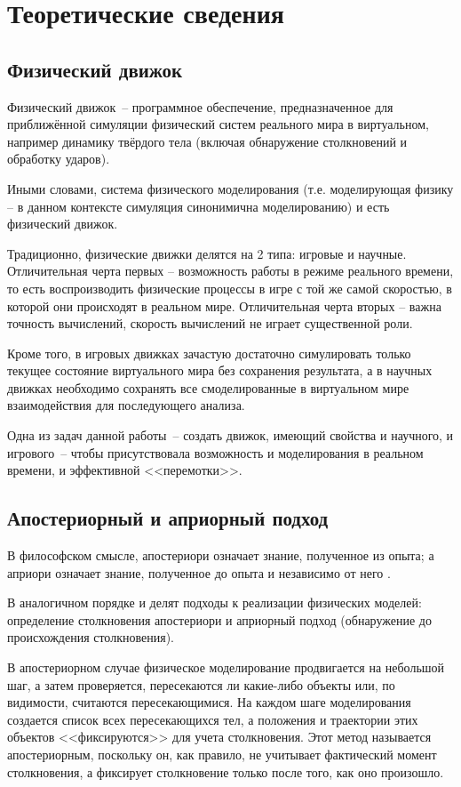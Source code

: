 \chapter{Теоретические сведения}

\section{Физический движок\TODO}

Физический движок~-- программное обеспечение, предназначенное для приближённой симуляции физический
систем реального мира в виртуальном, например динамику твёрдого тела
(включая обнаружение столкновений и обработку ударов).

Иными словами, система физического моделирования
(т.е. моделирующая физику -- в данном контексте симуляция синонимична моделированию)
и есть физический движок.

Традиционно, физические движки делятся на 2 типа: игровые и научные.
Отличительная черта первых --
возможность работы в режиме реального времени, то есть воспроизводить физические процессы в игре
с той же самой скоростью, в которой они происходят в реальном мире.
Отличительная черта вторых -- важна точность вычислений, скорость вычислений не играет существенной роли.

Кроме того, в игровых движках зачастую достаточно симулировать только текущее состояние виртуального мира без сохранения результата,
а в научных движках необходимо сохранять все смоделированные в виртуальном мире взаимодействия для последующего анализа.

Одна из задач данной работы~-- создать движок, имеющий свойства и научного, и игрового~--
чтобы присутствовала возможность и моделирования в реальном времени, и эффективной <<перемотки>>.

\section{Апостериорный и априорный подход}

В философском смысле, апостериори означает знание, полученное из опыта;
а априори означает знание, полученное до опыта и независимо от него \cite[с.~105-106]{kant}.

В аналогичном порядке и делят подходы к реализации физических моделей:
определение столкновения апостериори и
априорный подход (обнаружение до происхождения столкновения).

В апостериорном случае физическое моделирование продвигается на небольшой шаг, а затем проверяется,
пересекаются ли какие-либо объекты или, по видимости, считаются пересекающимися. На каждом шаге
моделирования создается список всех пересекающихся тел, а положения и траектории этих объектов <<фиксируются>>
для учета столкновения. Этот метод называется апостериорным, поскольку он, как правило, не учитывает фактический
момент столкновения, а фиксирует столкновение только после того, как оно произошло.

